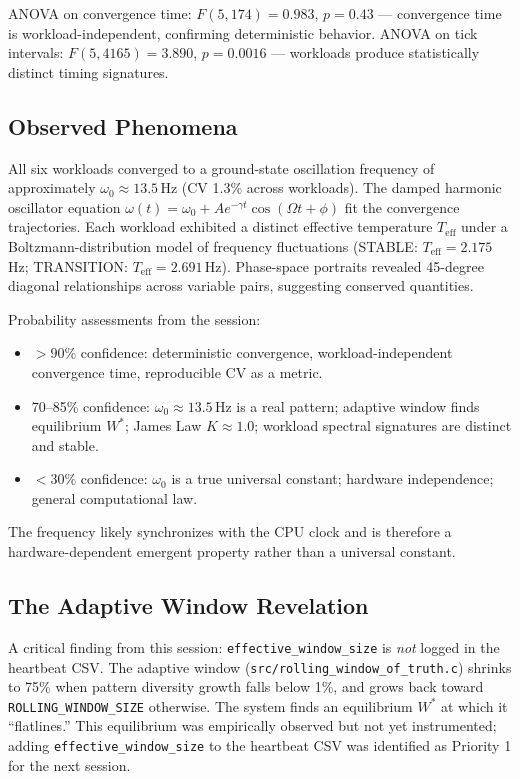 ANOVA on convergence time: $F(5,174) = 0.983$, $p = 0.43$ — convergence
time is workload-independent, confirming deterministic behavior.
ANOVA on tick intervals: $F(5,4165) = 3.890$, $p = 0.0016$ — workloads
produce statistically distinct timing signatures.

\subsection{Observed Phenomena}

All six workloads converged to a ground-state oscillation frequency of
approximately $\omega_0 \approx 13.5$\,Hz (CV 1.3\% across workloads).
The damped harmonic oscillator equation $\omega(t) = \omega_0 +
A e^{-\gamma t} \cos(\Omega t + \phi)$ fit the convergence trajectories.
Each workload exhibited a distinct effective temperature $T_\text{eff}$
under a Boltzmann-distribution model of frequency fluctuations
(STABLE: $T_\text{eff} = 2.175$\,Hz; TRANSITION: $T_\text{eff} =
2.691$\,Hz). Phase-space portraits revealed 45-degree diagonal
relationships across variable pairs, suggesting conserved quantities.

Probability assessments from the session:
\begin{itemize}
  \item $> 90\%$ confidence: deterministic convergence, workload-independent
        convergence time, reproducible CV as a metric.
  \item 70--85\% confidence: $\omega_0 \approx 13.5$\,Hz is a real pattern;
        adaptive window finds equilibrium $W^*$; James Law $K \approx 1.0$;
        workload spectral signatures are distinct and stable.
  \item $< 30\%$ confidence: $\omega_0$ is a true universal constant;
        hardware independence; general computational law.
\end{itemize}

The frequency likely synchronizes with the CPU clock and is therefore a
hardware-dependent emergent property rather than a universal constant.

\subsection{The Adaptive Window Revelation}

A critical finding from this session: \texttt{effective\_window\_size} is
\emph{not} logged in the heartbeat CSV. The adaptive window
(\texttt{src/rolling\_window\_of\_truth.c}) shrinks to 75\% when pattern
diversity growth falls below 1\%, and grows back toward
\texttt{ROLLING\_WINDOW\_SIZE} otherwise. The system finds an equilibrium
$W^*$ at which it ``flatlines.'' This equilibrium was empirically observed
but not yet instrumented; adding \texttt{effective\_window\_size} to the
heartbeat CSV was identified as Priority 1 for the next session.

